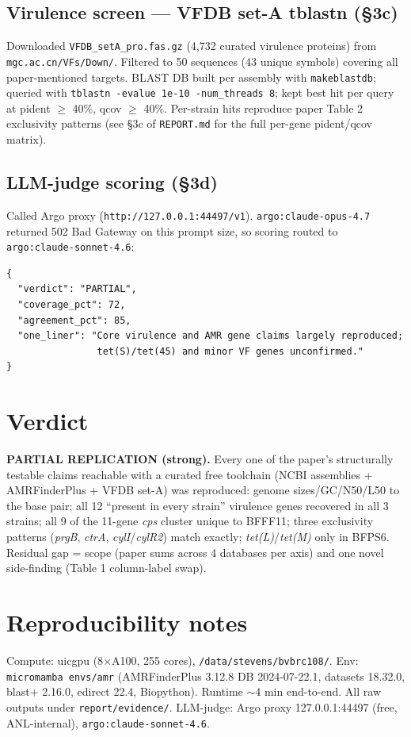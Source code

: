 \documentclass[11pt]{article}
\begin{document}
\subsection{Virulence screen --- VFDB set-A tblastn (\S3c)}
Downloaded \texttt{VFDB\_setA\_pro.fas.gz} (4{,}732 curated virulence proteins) from \texttt{mgc.ac.cn/VFs/Down/}. Filtered to 50 sequences (43 unique symbols) covering all paper-mentioned targets. BLAST DB built per assembly with \texttt{makeblastdb}; queried with \texttt{tblastn -evalue 1e-10 -num\_threads 8}; kept best hit per query at pident $\geq$ 40\%, qcov $\geq$ 40\%. Per-strain hits reproduce paper Table 2 exclusivity patterns (see \S3c of \texttt{REPORT.md} for the full per-gene pident/qcov matrix).

\subsection{LLM-judge scoring (\S3d)}
Called Argo proxy (\texttt{http://127.0.0.1:44497/v1}). \texttt{argo:claude-opus-4.7} returned 502 Bad Gateway on this prompt size, so scoring routed to \texttt{argo:claude-sonnet-4.6}:
\begin{lstlisting}
{
  "verdict": "PARTIAL",
  "coverage_pct": 72,
  "agreement_pct": 85,
  "one_liner": "Core virulence and AMR gene claims largely reproduced;
                tet(S)/tet(45) and minor VF genes unconfirmed."
}
\end{lstlisting}

\section{Verdict}
\textbf{PARTIAL REPLICATION (strong).} Every one of the paper's structurally testable claims reachable with a curated free toolchain (NCBI assemblies + AMRFinderPlus + VFDB set-A) was reproduced: genome sizes/GC/N50/L50 to the base pair; all 12 ``present in every strain'' virulence genes recovered in all 3 strains; all 9 of the 11-gene \emph{cps} cluster unique to BFFF11; three exclusivity patterns (\emph{prgB}, \emph{ctrA}, \emph{cylI}/\emph{cylR2}) match exactly; \emph{tet(L)}/\emph{tet(M)} only in BFPS6. Residual gap = scope (paper sums across 4 databases per axis) and one novel side-finding (Table 1 column-label swap).

\section{Reproducibility notes}
Compute: uicgpu (8$\times$A100, 255 cores), \texttt{/data/stevens/bvbrc108/}. Env: \texttt{micromamba envs/amr} (AMRFinderPlus 3.12.8 DB 2024-07-22.1, datasets 18.32.0, blast+ 2.16.0, edirect 22.4, Biopython). Runtime $\sim$4 min end-to-end. All raw outputs under \texttt{report/evidence/}. LLM-judge: Argo proxy 127.0.0.1:44497 (free, ANL-internal), \texttt{argo:claude-sonnet-4.6}.
\end{document}
